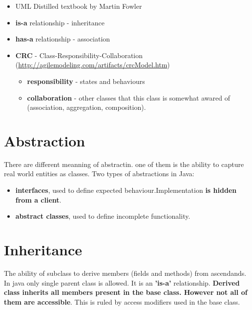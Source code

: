\documentclass{report}
\begin{document}
\begin{itemize}
	\item UML Distilled textbook by Martin Fowler 
	\item \textbf{is-a} relationship - inheritance
	\item \textbf{has-a} relationship - association
	\item \textbf{CRC} - Class-Responsibility-Collaboration (\url{http://agilemodeling.com/artifacts/crcModel.htm})
	\begin{itemize}
		\item \textbf{responsibility} - states and behaviours
		\item \textbf{collaboration} - other classes that this class is somewhat awared of (association, aggregation,
		composition).
	\end{itemize}
\end{itemize}

\chapter{Abstraction}
There are different meanning of abstractin. one of them is the ability to capture real world entities as classes.
Two types of abstractions in Java:
\begin{itemize}
	\item \textbf{interfaces}, used to define expected behaviour.Implementation \textbf{is hidden from a client}.
	\item \textbf{abstract classes}, used to define incomplete functionality.
\end{itemize}

\chapter{Inheritance}
The ability of subclass to derive members (fields and methods) from ascendands. In java only single parent class is allowed. It is an \textbf{'is-a'} relationship.
\textbf{Derived class inherits all members present in the base class. However not all of them are accessible}. This is ruled by access modifiers used in the base class.
\end{document}
